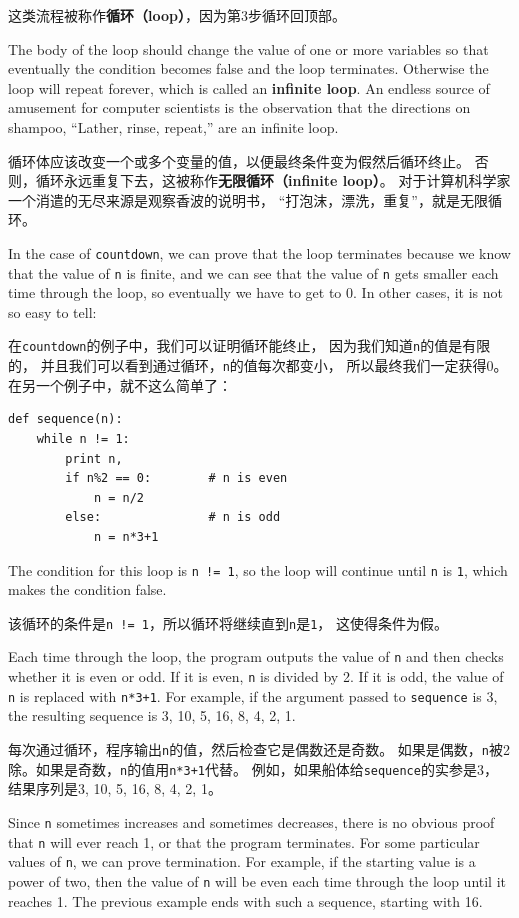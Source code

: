 \documentclass[10pt]{book}
\begin{document}
\begin{CJK}{UTF8}{gbsn}
这类流程被称作{\bf 循环（loop）}，因为第3步循环回顶部。

The body of the loop should change the value of one or more variables
so that eventually the condition becomes false and the loop
terminates.  Otherwise the loop will repeat forever, which is called
an {\bf infinite loop}.  An endless source of amusement for computer
scientists is the observation that the directions on shampoo,
``Lather, rinse, repeat,'' are an infinite loop.

循环体应该改变一个或多个变量的值，以便最终条件变为假然后循环终止。
否则，循环永远重复下去，这被称作{\bf 无限循环（infinite loop）}。
对于计算机科学家一个消遣的无尽来源是观察香波的说明书，
``打泡沫，漂洗，重复''，就是无限循环。

In the case of {\tt countdown}, we can prove that the loop
terminates because we know that the value of {\tt n} is finite, and we
can see that the value of {\tt n} gets smaller each time through the
loop, so eventually we have to get to 0.  In other
cases, it is not so easy to tell:

在{\tt countdown}的例子中，我们可以证明循环能终止，
因为我们知道{\tt n}的值是有限的，
并且我们可以看到通过循环，{\tt n}的值每次都变小，
所以最终我们一定获得0。
在另一个例子中，就不这么简单了：

\begin{verbatim}
def sequence(n):
    while n != 1:
        print n,
        if n%2 == 0:        # n is even
            n = n/2
        else:               # n is odd
            n = n*3+1
\end{verbatim}
%
The condition for this loop is {\tt n != 1}, so the loop will continue
until {\tt n} is {\tt 1}, which makes the condition false.

该循环的条件是{\tt n != 1}，所以循环将继续直到{\tt n}是{\tt 1}，
这使得条件为假。

Each time through the loop, the program outputs the value of {\tt n}
and then checks whether it is even or odd.  If it is even, {\tt n} is 
divided by 2.  If it is odd, the value of {\tt n} is replaced with
{\tt n*3+1}. For example, if the argument passed
to {\tt sequence} is 3, the resulting sequence is 3, 10, 5, 16, 8, 4, 2, 1.

每次通过循环，程序输出{\tt n}的值，然后检查它是偶数还是奇数。
如果是偶数，{\tt n}被2除。如果是奇数，{\tt n}的值用{\tt n*3+1}代替。
例如，如果船体给{\tt sequence}的实参是3，
结果序列是3, 10, 5, 16, 8, 4, 2, 1。

Since {\tt n} sometimes increases and sometimes decreases, there is no
obvious proof that {\tt n} will ever reach 1, or that the program
terminates.  For some particular values of {\tt n}, we can prove
termination.  For example, if the starting value is a power of two,
then the value of {\tt n} will be even each time through the loop
until it reaches 1. The previous example ends with such a sequence,
starting with 16.


\end{CJK}
\end{document}
